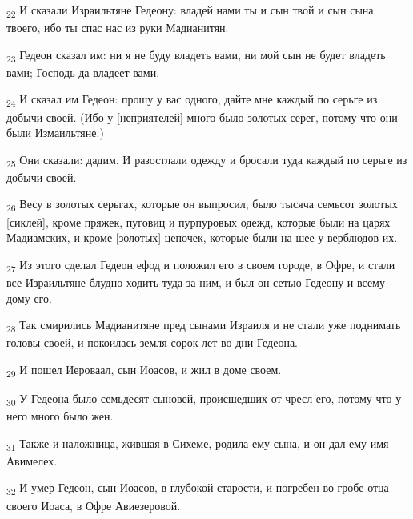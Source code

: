 \begin{tcolorbox}
\textsubscript{22} И сказали Израильтяне Гедеону: владей нами ты и сын твой и сын сына твоего, ибо ты спас нас из руки Мадианитян.
\end{tcolorbox}
\begin{tcolorbox}
\textsubscript{23} Гедеон сказал им: ни я не буду владеть вами, ни мой сын не будет владеть вами; Господь да владеет вами.
\end{tcolorbox}
\begin{tcolorbox}
\textsubscript{24} И сказал им Гедеон: прошу у вас одного, дайте мне каждый по серьге из добычи своей. (Ибо у [неприятелей] много было золотых серег, потому что они были Измаильтяне.)
\end{tcolorbox}
\begin{tcolorbox}
\textsubscript{25} Они сказали: дадим. И разостлали одежду и бросали туда каждый по серьге из добычи своей.
\end{tcolorbox}
\begin{tcolorbox}
\textsubscript{26} Весу в золотых серьгах, которые он выпросил, было тысяча семьсот золотых [сиклей], кроме пряжек, пуговиц и пурпуровых одежд, которые были на царях Мадиамских, и кроме [золотых] цепочек, которые были на шее у верблюдов их.
\end{tcolorbox}
\begin{tcolorbox}
\textsubscript{27} Из этого сделал Гедеон ефод и положил его в своем городе, в Офре, и стали все Израильтяне блудно ходить туда за ним, и был он сетью Гедеону и всему дому его.
\end{tcolorbox}
\begin{tcolorbox}
\textsubscript{28} Так смирились Мадианитяне пред сынами Израиля и не стали уже поднимать головы своей, и покоилась земля сорок лет во дни Гедеона.
\end{tcolorbox}
\begin{tcolorbox}
\textsubscript{29} И пошел Иероваал, сын Иоасов, и жил в доме своем.
\end{tcolorbox}
\begin{tcolorbox}
\textsubscript{30} У Гедеона было семьдесят сыновей, происшедших от чресл его, потому что у него много было жен.
\end{tcolorbox}
\begin{tcolorbox}
\textsubscript{31} Также и наложница, жившая в Сихеме, родила ему сына, и он дал ему имя Авимелех.
\end{tcolorbox}
\begin{tcolorbox}
\textsubscript{32} И умер Гедеон, сын Иоасов, в глубокой старости, и погребен во гробе отца своего Иоаса, в Офре Авиезеровой.
\end{tcolorbox}
